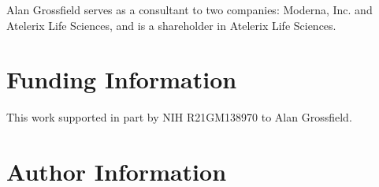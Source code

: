 \documentclass[9pt,training,ASAPversion]{livecoms}
\begin{document}
Alan Grossfield serves as a consultant to two companies: Moderna, Inc.
and Atelerix Life Sciences, and is a shareholder in Atelerix Life Sciences.

\section{Funding Information}
This work supported in part by NIH R21GM138970 to Alan Grossfield.

\section*{Author Information}
\makeorcid




\end{document}
